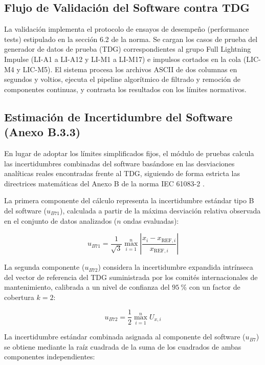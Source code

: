 \subsection{Flujo de Validación del Software contra TDG}
La validación implementa el protocolo de ensayos de desempeño (performance tests) estipulado en la sección 6.2 de la norma. Se cargan los casos de prueba del generador de datos de prueba (TDG) correspondientes al grupo Full Lightning Impulse (LI-A1 a LI-A12 y LI-M1 a LI-M17) e impulsos cortados en la cola (LIC-M4 y LIC-M5). El sistema procesa los archivos ASCII de dos columnas en segundos y voltios, ejecuta el pipeline algorítmico de filtrado y remoción de componentes continuas, y contrasta los resultados con los límites normativos.

\subsection{Estimación de Incertidumbre del Software (Anexo B.3.3)}
En lugar de adoptar los límites simplificados fijos, el módulo de pruebas calcula las incertidumbres combinadas del software basándose en las desviaciones analíticas reales encontradas frente al TDG, siguiendo de forma estricta las directrices matemáticas del Anexo B de la norma IEC 61083-2 \cite{iec61083_2}.

La primera componente del cálculo representa la incertidumbre estándar tipo B del software ($u_{B71}$), calculada a partir de la máxima desviación relativa observada en el conjunto de datos analizados ($n$ ondas evaluadas):

\begin{equation}
u_{B71} = \frac{1}{\sqrt{3}} \max_{i=1}^{n} \left| \frac{x_i - x_{\text{REF},i}}{x_{\text{REF},i}} \right|
\label{eq:u_B71}
\end{equation}

La segunda componente ($u_{B72}$) considera la incertidumbre expandida intrínseca del vector de referencia del TDG suministrada por los comités internacionales de mantenimiento, calibrada a un nivel de confianza del $\SI{95}{\percent}$ con un factor de cobertura $k=2$:

\begin{equation}
u_{B72} = \frac{1}{2} \max_{i=1}^{n} U_{x,i}
\label{eq:u_B72}
\end{equation}

La incertidumbre estándar combinada asignada al componente del software ($u_{B7}$) se obtiene mediante la raíz cuadrada de la suma de los cuadrados de ambas componentes independientes:

